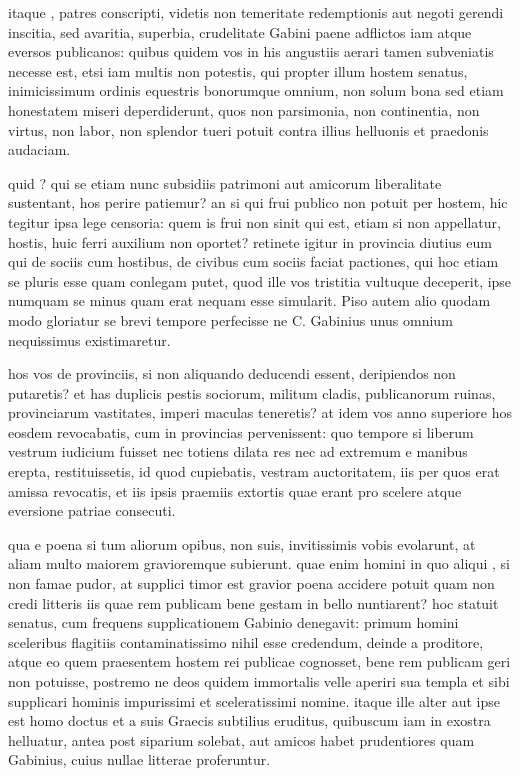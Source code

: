  itaque , patres conscripti, videtis non temeritate redemptionis aut negoti gerendi inscitia, sed avaritia, superbia, crudelitate Gabini paene adflictos iam atque eversos publicanos: quibus quidem vos in his angustiis aerari tamen subveniatis necesse est, etsi iam multis non potestis, qui propter illum hostem senatus, inimicissimum ordinis equestris bonorumque omnium, non solum bona sed etiam honestatem miseri deperdiderunt, quos non parsimonia, non continentia, non virtus, non labor, non splendor tueri potuit contra illius helluonis et praedonis audaciam.

 quid ? qui se etiam nunc subsidiis patrimoni aut amicorum liberalitate sustentant, hos perire patiemur? an si qui frui publico non potuit per hostem, hic tegitur ipsa lege censoria: quem is frui non sinit qui est, etiam si non appellatur, hostis, huic ferri auxilium non oportet? retinete igitur in provincia diutius eum qui de sociis cum hostibus, de civibus cum sociis faciat pactiones, qui hoc etiam se pluris esse quam conlegam putet, quod ille vos tristitia vultuque deceperit, ipse numquam se minus quam erat nequam esse simularit. Piso autem alio quodam modo gloriatur se brevi tempore perfecisse ne C. Gabinius unus omnium nequissimus existimaretur.

 hos vos de provinciis, si non aliquando deducendi essent, deripiendos non putaretis? et has duplicis pestis sociorum, militum cladis, publicanorum ruinas, provinciarum vastitates, imperi maculas teneretis? at idem vos anno superiore hos eosdem revocabatis, cum in provincias pervenissent: quo tempore si liberum vestrum iudicium fuisset nec totiens dilata res nec ad extremum e manibus erepta, restituissetis, id quod cupiebatis, vestram auctoritatem, iis per quos erat amissa revocatis, et iis ipsis praemiis extortis quae erant pro scelere atque eversione patriae consecuti.

 qua e poena si tum aliorum opibus, non suis, invitissimis vobis evolarunt, at aliam multo maiorem gravioremque subierunt. quae enim homini in quo aliqui , si non famae pudor, at supplici timor est gravior poena accidere potuit quam non credi litteris iis quae rem publicam bene gestam in bello nuntiarent? hoc statuit senatus, cum frequens supplicationem Gabinio denegavit: primum homini sceleribus flagitiis contaminatissimo nihil esse credendum, deinde a proditore, atque eo quem praesentem hostem rei publicae cognosset, bene rem publicam geri non potuisse, postremo ne deos quidem immortalis velle aperiri sua templa et sibi supplicari hominis impurissimi et sceleratissimi nomine. itaque ille alter aut ipse est homo doctus et a suis Graecis subtilius eruditus, quibuscum iam in exostra helluatur, antea post siparium solebat, aut amicos habet prudentiores quam Gabinius, cuius nullae litterae proferuntur.

